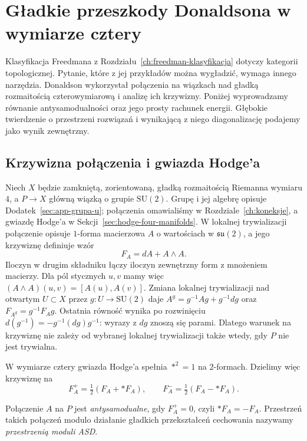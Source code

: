 \chapter{Gładkie przeszkody Donaldsona w wymiarze cztery}
\label{ch:donaldson}

Klasyfikacja Freedmana z Rozdziału~\ref{ch:freedman-klasyfikacja}
dotyczy kategorii topologicznej. Pytanie, które z jej przykładów
można wygładzić, wymaga innego narzędzia. Donaldson wykorzystał
połączenia na wiązkach nad gładką rozmaitością czterowymiarową
i analizę ich krzywizny. Poniżej wyprowadzamy równanie
antysamodualności oraz jego prosty rachunek energii. Głębokie
twierdzenie o przestrzeni rozwiązań i wynikającą z niego
diagonalizację podajemy jako wynik zewnętrzny.

\section{Krzywizna połączenia i gwiazda Hodge'a}
\label{sec:donaldson-asd}

Niech $X$ będzie zamkniętą, zorientowaną, gładką
rozmaitością Riemanna wymiaru $4$, a $P\to X$ główną
wiązką o grupie $\mathrm{SU}(2)$. Grupę i jej algebrę
opisuje Dodatek~\ref{sec:app-grupa-u}; połączenia
omawialiśmy w Rozdziale~\ref{ch:koneksje}, a gwiazdę Hodge'a
w Sekcji~\ref{sec:hodge-four-manifolds}.
W lokalnej trywializacji połączenie opisuje
$1$-forma macierzowa $A$ o wartościach w
$\mathfrak{su}(2)$, a jego krzywiznę definiuje wzór
\begin{equation}\label{eq:donaldson-curvature}
 F_A=dA+A\wedge A.
\end{equation}
Iloczyn w drugim składniku łączy iloczyn zewnętrzny form
z mnożeniem macierzy. Dla pól stycznych $u,v$ mamy więc
$(A\wedge A)(u,v)=[A(u),A(v)]$.
Zmiana lokalnej trywializacji nad otwartym $U\subset X$
przez $g:U\to\mathrm{SU}(2)$ daje
$A^g=g^{-1}Ag+g^{-1}dg$ oraz
$F_{A^g}=g^{-1}F_Ag$. Ostatnia równość wynika po
rozwinięciu $d(g^{-1})=-g^{-1}(dg)g^{-1}$:
wyrazy z $dg$ znoszą się parami. Dlatego warunek
na krzywiznę nie zależy od wybranej lokalnej
trywializacji także wtedy, gdy $P$ nie jest trywialna.

W wymiarze cztery gwiazda Hodge'a spełnia
$*^2=1$ na $2$-formach. Dzielimy więc krzywiznę na
\[
 F_A^+=\tfrac12(F_A+*F_A),\qquad
 F_A^-=\tfrac12(F_A-*F_A).
\]

\begin{definicja}
\label{def:donaldson-asd}
Połączenie $A$ na $P$ jest \emph{antysamodualne},
gdy $F_A^+=0$, czyli $*F_A=-F_A$.
Przestrzeń takich połączeń modulo działanie
gładkich przekształceń cechowania nazywamy
\emph{przestrzenią moduli ASD}.
\end{definicja}

